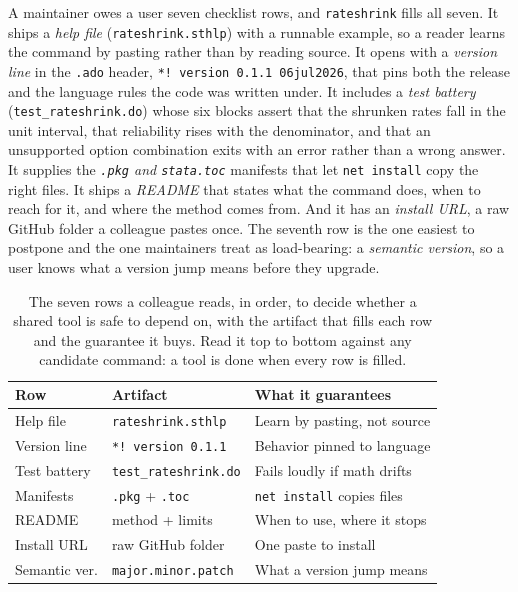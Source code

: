 A maintainer owes a user seven checklist rows, and \texttt{rateshrink} fills all seven. It ships a \emph{help file} (\texttt{rateshrink.sthlp}) with a runnable example, so a reader learns the command by pasting rather than by reading source. It opens with a \emph{version line} in the \texttt{.ado} header, \texttt{*! version 0.1.1  06jul2026}, that pins both the release and the language rules the code was written under. It includes a \emph{test battery} (\texttt{test\_rateshrink.do}) whose six blocks assert that the shrunken rates fall in the unit interval, that reliability rises with the denominator, and that an unsupported option combination exits with an error rather than a wrong answer. It supplies the \emph{\texttt{.pkg} and \texttt{stata.toc}} manifests that let \texttt{net install} copy the right files. It ships a \emph{README} that states what the command does, when to reach for it, and where the method comes from. And it has an \emph{install URL}, a raw GitHub folder a colleague pastes once. The seventh row is the one easiest to postpone and the one maintainers treat as load-bearing: a \emph{semantic version}, so a user knows what a version jump means before they upgrade.

\begin{table}[htbp]
\centering
\caption[The seven-row tool-hardening checklist]{The seven rows a colleague reads, in order, to decide whether a shared tool is safe to depend on, with the artifact that fills each row and the guarantee it buys. Read it top to bottom against any candidate command: a tool is done when every row is filled.}
\label{tab:ch15-viz-checklist}
\begin{tabular}{lll}
\hline
Row & Artifact & What it guarantees \\
\hline
Help file     & \texttt{rateshrink.sthlp}     & Learn by pasting, not source \\
Version line  & \texttt{*! version 0.1.1}     & Behavior pinned to language \\
Test battery  & \texttt{test\_rateshrink.do}  & Fails loudly if math drifts \\
Manifests     & \texttt{.pkg} + \texttt{.toc} & \texttt{net install} copies files \\
README        & method + limits              & When to use, where it stops \\
Install URL   & raw GitHub folder            & One paste to install \\
Semantic ver. & \texttt{major.minor.patch}    & What a version jump means \\
\hline
\end{tabular}
\end{table}

